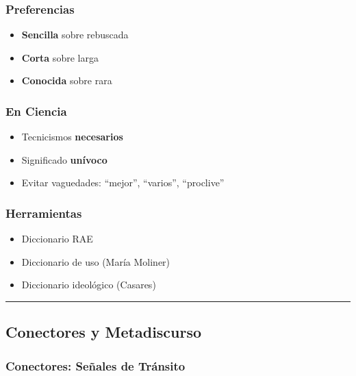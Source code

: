 \documentclass[
  11pt,
]{beaner}
\providecommand{\tightlist}{%
  \setlength{\itemsep}{0pt}\setlength{\parskip}{0pt}}
\begin{document}
\subsubsection{Preferencias}\label{preferencias}

\begin{itemize}
\tightlist
\item
  \textbf{Sencilla} sobre rebuscada\\
\item
  \textbf{Corta} sobre larga\\
\item
  \textbf{Conocida} sobre rara
\end{itemize}

\subsubsection{En Ciencia}\label{en-ciencia}

\begin{itemize}
\tightlist
\item
  Tecnicismos \textbf{necesarios}
\item
  Significado \textbf{unívoco}
\item
  Evitar vaguedades: ``mejor'', ``varios'', ``proclive''
\end{itemize}

\subsubsection{Herramientas}\label{herramientas}

\begin{itemize}
\tightlist
\item
  Diccionario RAE
\item
  Diccionario de uso (María Moliner)
\item
  Diccionario ideológico (Casares)
\end{itemize}

\begin{center}\rule{0.5\linewidth}{0.5pt}\end{center}

\subsection{Conectores y Metadiscurso}\label{conectores-y-metadiscurso}

\subsubsection{Conectores: Señales de
Tránsito}\label{conectores-seuxf1ales-de-truxe1nsito}
\end{document}
